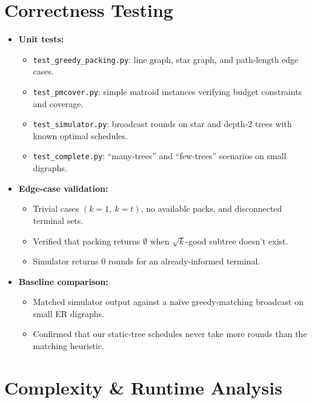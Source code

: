 \documentclass[11pt]{article}
\begin{document}
\section{Correctness Testing}

\begin{itemize}
  \item \textbf{Unit tests:}
    \begin{itemize}
      \item \texttt{test\_greedy\_packing.py}: line graph, star graph, and path‐length edge cases.
      \item \texttt{test\_pmcover.py}: simple matroid instances verifying budget constraints and coverage.
      \item \texttt{test\_simulator.py}: broadcast rounds on star and depth‐2 trees with known optimal schedules.
      \item \texttt{test\_complete.py}: “many‐trees” and “few‐trees” scenarios on small digraphs.
    \end{itemize}

  \item \textbf{Edge‐case validation:}
    \begin{itemize}
      \item Trivial cases \((k=1,\ k=t)\), no available packs, and disconnected terminal sets.
      \item Verified that packing returns \(\emptyset\) when \(\sqrt{k}\)-good subtree doesn’t exist.
      \item Simulator returns 0 rounds for an already‐informed terminal.
    \end{itemize}

  \item \textbf{Baseline comparison:}
    \begin{itemize}
      \item Matched simulator output against a naïve greedy‐matching broadcast on small ER digraphs.
      \item Confirmed that our static‐tree schedules never take more rounds than the matching heuristic.
    \end{itemize}
\end{itemize}
\section{Complexity \& Runtime Analysis}
\end{document}
